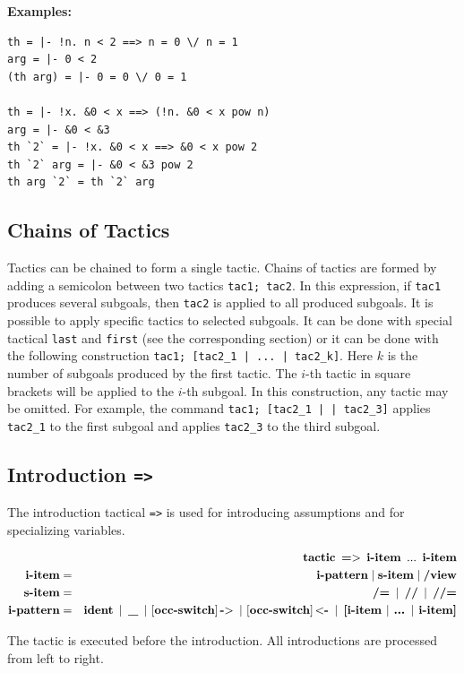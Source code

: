 \documentclass[a4paper]{article}
\newcommand{\xx}[1]{\mathop{\text{\bf #1}}}
\begin{document}
{\bf Examples:}
\begin{verbatim}
th = |- !n. n < 2 ==> n = 0 \/ n = 1
arg = |- 0 < 2
(th arg) = |- 0 = 0 \/ 0 = 1

th = |- !x. &0 < x ==> (!n. &0 < x pow n)
arg = |- &0 < &3
th `2` = |- !x. &0 < x ==> &0 < x pow 2
th `2` arg = |- &0 < &3 pow 2
th arg `2` = th `2` arg
\end{verbatim}

\subsection{Chains of Tactics}
Tactics can be chained to form a single tactic. Chains of tactics are formed by adding a semicolon between two tactics \verb|tac1; tac2|. In this expression, if \verb|tac1| produces several subgoals, then \verb|tac2| is applied to all produced subgoals. It is possible to apply specific tactics to selected subgoals. It can be done with special tactical \verb|last| and \verb|first| (see the corresponding section) or it can be done with the following construction \verb$tac1; [tac2_1 | ... | tac2_k]$. Here $k$ is the number of subgoals produced by the first tactic. The $i$-th tactic in square brackets will be applied to the $i$-th subgoal. In this construction, any tactic may be omitted. For example, the command \verb$tac1; [tac2_1 | | tac2_3]$ applies \verb|tac2_1| to the first subgoal and applies \verb|tac2_3| to the third subgoal.


\subsection{Introduction {\tt =>}}
The introduction tactical \verb|=>| is used for introducing assumptions and for specializing variables.

\begin{eqnarray*}
&&\xx{tactic}\ \xx{=$>$}\ \xx{i-item}\ ...\ \xx{i-item}\\
\xx{i-item} &=& \xx{i-pattern} \mathrel{|} \xx{s-item} \mathrel{|} \xx{/view}\\
\xx{s-item} &=& \xx{/=}\ |\ \xx{//}\ |\ \xx{//=}\\
\xx{i-pattern} &=& \xx{ident}\ |\ \xx{\_}\ |\ 
				[\xx{occ-switch}]\xx{-$>$}\ |\ [\xx{occ-switch}]\xx{$<$-}\ |\ 
				\xx{[i-item $|$ ... $|$ i-item]}
\end{eqnarray*}

The tactic is executed before the introduction. All introductions are processed from left to right.
\end{document}
